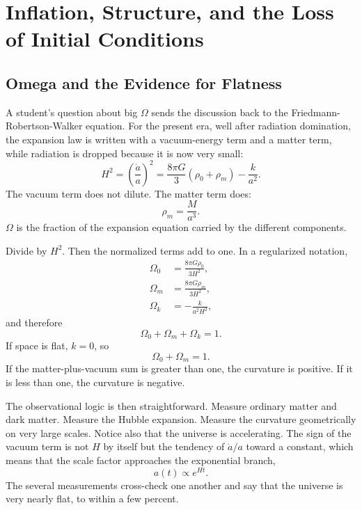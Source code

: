 \chapter{Inflation, Structure, and the Loss of Initial Conditions}

\section{Omega and the Evidence for Flatness}

A student's question about big \(\Omega\) sends the discussion back to the Friedmann-Robertson-Walker equation. For the present era, well after radiation domination, the expansion law is written with a vacuum-energy term and a matter term, while radiation is dropped because it is now very small:
\begin{equation}
H^2=\left(\frac{\dot a}{a}\right)^2=\frac{8\pi G}{3}\left(\rho_0+\rho_m\right)-\frac{k}{a^2}.
\end{equation}
The vacuum term does not dilute. The matter term does:
\begin{equation}
\rho_m=\frac{M}{a^3}.
\end{equation}
\(\Omega\) is the fraction of the expansion equation carried by the different components.

Divide by \(H^2\). Then the normalized terms add to one. In a regularized notation,
\begin{equation}
\begin{aligned}
\Omega_0&=\frac{8\pi G\rho_0}{3H^2},\\
\Omega_m&=\frac{8\pi G\rho_m}{3H^2},\\
\Omega_k&=-\frac{k}{a^2H^2},
\end{aligned}
\end{equation}
and therefore
\begin{equation}
\Omega_0+\Omega_m+\Omega_k=1.
\end{equation}
If space is flat, \(k=0\), so
\begin{equation}
\Omega_0+\Omega_m=1.
\end{equation}
If the matter-plus-vacuum sum is greater than one, the curvature is positive. If it is less than one, the curvature is negative.

The observational logic is then straightforward. Measure ordinary matter and dark matter. Measure the Hubble expansion. Measure the curvature geometrically on very large scales. Notice also that the universe is accelerating. The sign of the vacuum term is not \(H\) by itself but the tendency of \(\dot a/a\) toward a constant, which means that the scale factor approaches the exponential branch,
\begin{equation}
a(t)\propto e^{Ht}.
\end{equation}
The several measurements cross-check one another and say that the universe is very nearly flat, to within a few percent.

